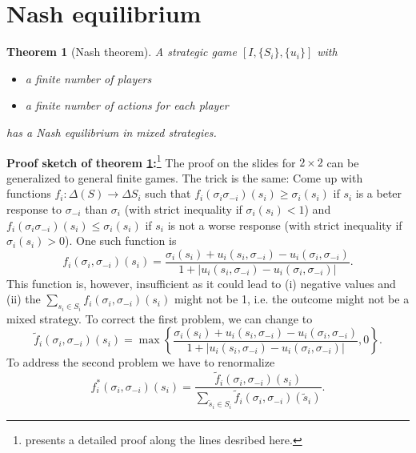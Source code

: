 \documentclass[a4paper,11pt]{article}
\newtheorem{theorem}{Theorem}
\begin{document}
\section{Nash equilibrium}
\label{sec:nash-equilibrium}

\begin{theorem}[Nash theorem]\label{thm:nash}
A strategic game \([I, \{S_i\},\{u_i\}]\) with
\begin{itemize}
\item a finite number of players 
 \item a finite number of actions for each player
\end{itemize}
has a Nash equilibrium in mixed strategies.
\end{theorem}

\textbf{Proof sketch of theorem \ref{thm:nash}:}\footnote{\citet[ch. 5.3]{maschler2013game} presents a detailed proof along the lines desribed here.} The proof on the slides for $2\times 2$ can be generalized to general finite games. The trick is the same: Come up with functions $f_i:\Delta (S)\rightarrow \Delta S_i$ such that $f_i(\sigma_i\sigma_{-i})(s_i)\geq\sigma_i(s_i)$ if $s_i$ is a beter response to $\sigma_{-i}$ than $\sigma_i$ (with strict inequality if $\sigma_i(s_i)<1$) and $f_i(\sigma_i\sigma_{-i})(s_i)\leq\sigma_i(s_i)$ if $s_i$ is not a worse response (with strict inequality if $\sigma_i(s_i)>0$). One such function is
\begin{equation*}
  f_i(\sigma_i,\sigma_{-i})(s_i)=\frac{\sigma_i(s_i)+u_i(s_i,\sigma_{-i})-u_i(\sigma_i,\sigma_{-i})}{1+|u_i(s_i,\sigma_{-i})-u_i(\sigma_i,\sigma_{-i})|}.
\end{equation*}
This function is, however, insufficient as it could lead to (i) negative values and (ii) the $\sum_{s_i\in S_i} f_i(\sigma_i,\sigma_{-i})(s_i)$ might not be 1, i.e. the outcome might not be a mixed strategy. To correct the first problem, we can change to 
\begin{equation*}
  \tilde f_i(\sigma_i,\sigma_{-i})(s_i)=\max\left\{\frac{\sigma_i(s_i)+u_i(s_i,\sigma_{-i})-u_i(\sigma_i,\sigma_{-i})}{1+|u_i(s_i,\sigma_{-i})-u_i(\sigma_i,\sigma_{-i})|},0\right\}.
\end{equation*}
To address the second problem we have to renormalize
\begin{equation*}
  f_i^*(\sigma_i,\sigma_{-i})(s_i)=\frac{\tilde{f}_i(\sigma_i,\sigma_{-i})(s_i)}{\sum_{\tilde s_i\in S_i}\tilde{f}_i(\sigma_i,\sigma_{-i})(\tilde s_i)}.
\end{equation*}
\end{document}
